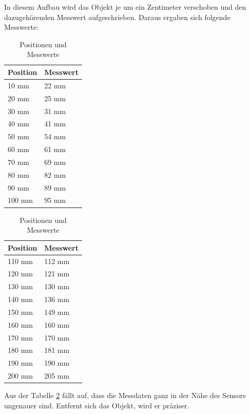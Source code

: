 In diesem Aufbau wird das Objekt je um ein Zentimeter verschoben und den dazugehörenden Messwert aufgeschrieben. Daraus ergaben sich folgende Messwerte:
\begin{table}[H]
\centering
\begin{minipage}{0.45\textwidth}
\centering
\begin{tabular}{@{}ll@{}}
\toprule
\textbf{Position} & \textbf{Messwert} \\
\midrule
10 mm  & 22 mm  \\
20 mm  & 25 mm  \\
30 mm  & 31 mm  \\
40 mm  & 41 mm  \\
50 mm  & 54 mm  \\
60 mm  & 61 mm  \\
70 mm  & 69 mm  \\
80 mm  & 82 mm  \\
90 mm  & 89 mm  \\
100 mm & 95 mm  \\
\bottomrule
\end{tabular}
\end{minipage}%
\hspace{0.05\textwidth} %
\begin{minipage}{0.45\textwidth}
\centering
\begin{tabular}{@{}ll@{}}
\toprule
\textbf{Position} & \textbf{Messwert} \\
\midrule
110 mm & 112 mm \\
120 mm & 121 mm \\
130 mm & 130 mm \\
140 mm & 136 mm \\
150 mm & 149 mm \\
160 mm & 160 mm \\
170 mm & 170 mm \\
180 mm & 181 mm \\
190 mm & 190 mm \\
200 mm & 205 mm \\
\bottomrule
\end{tabular}
\end{minipage}
\caption{Positionen und Messwerte}
\label{tab:UltraschallMD}
\end{table}

Aus der Tabelle \ref{tab:UltraschallMD} fällt auf, dass die Messdaten ganz in der Nähe des Sensors ungenauer sind. Entfernt sich das Objekt, wird er präziser.

